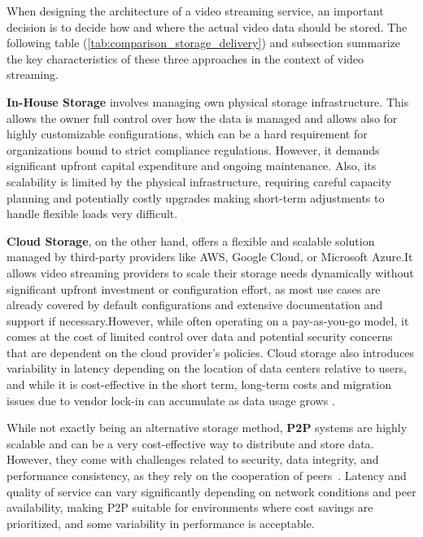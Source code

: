 When designing the architecture of a video streaming service, an important decision is to decide how and where the actual video data should be stored. The following table (\autoref{tab:comparison_storage_delivery}) and subsection summarize the key characteristics of these three approaches in the context of video streaming. 

\textbf{In-House Storage} involves managing own physical storage infrastructure. This allows the owner full control over how the data is managed and allows also for highly customizable configurations, which can be a hard requirement for organizations bound to strict compliance regulations. However, it demands significant upfront capital expenditure and ongoing maintenance. Also, its scalability is limited by the physical infrastructure, requiring careful capacity planning and potentially costly upgrades making short-term adjustments to handle flexible loads very difficult. 

\textbf{Cloud Storage}, on the other hand, offers a flexible and scalable solution managed by third-party providers like AWS, Google Cloud, or Microsoft Azure.It allows video streaming providers to scale their storage needs dynamically without significant upfront investment or configuration effort, as most use cases are already covered by default configurations and extensive documentation and support if necessary.However, while often operating on a pay-as-you-go model, it comes at the cost of limited control over data and potential security concerns that are dependent on the cloud provider's policies. Cloud storage also introduces variability in latency depending on the location of data centers relative to users, and while it is cost-effective in the short term, long-term costs and migration issues due to vendor lock-in can accumulate as data usage grows \parencite{cloud_streaming_cost}.

While not exactly being an alternative storage method, \textbf{\ac{P2P}} systems are highly scalable and can be a very cost-effective way to distribute and store data. However, they come with challenges related to security, data integrity, and performance consistency, as they rely on the cooperation of peers~\parencite{p2p}. Latency and quality of service can vary significantly depending on network conditions and peer availability, making \ac{P2P} suitable for environments where cost savings are prioritized, and some variability in performance is acceptable.

